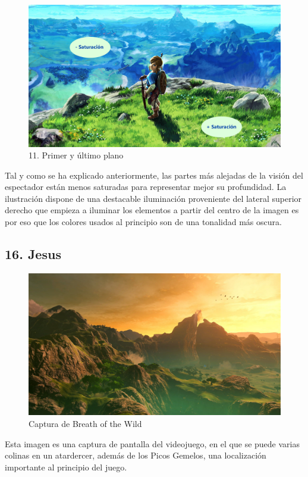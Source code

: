 \documentclass[12pt]{article}
\begin{document}
      \begin{figure}[H]
      \centering
      \includegraphics[scale=0.35]{images/Carlos/15/Planos.jpg}
      \caption{\small 11. Primer y último plano}
      \end{figure}
      Tal y como se ha explicado anteriormente, las partes más alejadas de la visión del espectador están menos saturadas para representar mejor su profundidad. La ilustración dispone de una destacable iluminación proveniente del lateral superior derecho que empieza a iluminar los elementos a partir del centro de la imagen es por eso que los colores usados al principio son de una tonalidad más oscura.
      \newpage



    \subsection{16. Jesus}
        \begin{figure}[H]
          \centering
          \includegraphics[scale = 0.25]{Jesus/Seccion16/16_concept_art (2).jpg}
          \caption{Captura de Breath of the Wild}
        \end{figure}
        Esta imagen es una captura de pantalla del videojuego, en el que se puede varias colinas en un atardercer, además de los Picos Gemelos, una localización importante al principio del juego.
\end{document}
